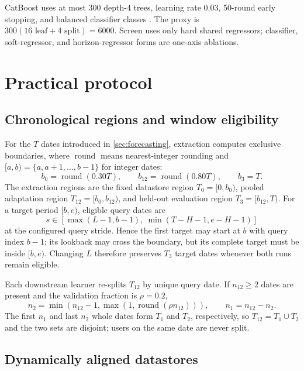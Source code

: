 \documentclass[10pt]{article}
\newcommand{\Tzero}{T_0}
\newcommand{\Tone}{T_1}
\newcommand{\Ttwo}{T_2}
\newcommand{\Tpool}{T_{12}}
\newcommand{\Tthree}{T_3}
\begin{document}
CatBoost uses at most 300 depth-4 trees, learning rate 0.03, 50-round early
stopping, and balanced classifier classes \citep{prokhorenkova2018catboost}.
The proxy is $300(16\text{ leaf}+4\text{ split})=6000$. Screen uses only hard
shared regressors; classifier, soft-regressor, and horizon-regressor forms are
one-axis ablations.

\section{Practical protocol}
\label{sec:practical}

\subsection{Chronological regions and window eligibility}

For the $T$ dates introduced in \cref{sec:forecasting}, extraction computes
exclusive boundaries, where $\operatorname{round}$ means nearest-integer
rounding and $[a,b)=\{a,a+1,\ldots,b-1\}$ for integer dates:
\[
 b_0=\operatorname{round}(0.30T),\qquad
 b_{12}=\operatorname{round}(0.80T),\qquad b_3=T.
\]
The extraction regions are the fixed datastore region $\Tzero=[0,b_0)$,
pooled adaptation region $\Tpool=[b_0,b_{12})$, and held-out evaluation
region $\Tthree=[b_{12},T)$. For a target period
$[b,e)$, eligible query dates are
\[
 s\in
 \left[\max(L-1,b-1),\ \min(T-H-1,e-H-1)\right]
\]
at the configured query stride. Hence the first target may start at $b$ with
query index $b-1$; its lookback may cross the boundary, but its complete target
must be inside $[b,e)$. Changing $L$ therefore preserves $\Tthree$ target dates
whenever both runs remain eligible.

Each downstream learner re-splits $\Tpool$ by unique query date. If
$n_{12}\geq2$ dates are present and the validation fraction is $\rho=0.2$,
\[
 n_2=\min(n_{12}-1,\max(1,\operatorname{round}(\rho n_{12}))),
 \qquad n_1=n_{12}-n_2.
\]
The first $n_1$ and last $n_2$ whole dates form $\Tone$ and $\Ttwo$,
respectively, so $\Tpool=\Tone\cup\Ttwo$ and the two sets are disjoint; users
on the same date are never split.

\subsection{Dynamically aligned datastores}
\end{document}
